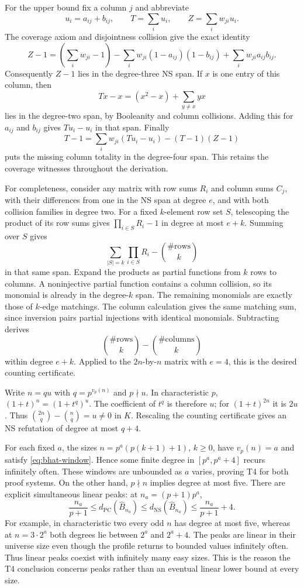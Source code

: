 \documentclass[11pt,a4paper]{article}
\theoremstyle{definition}\newtheorem{definition}[theorem]{Definition}
\theoremstyle{remark}\newtheorem{remark}[theorem]{Remark}
\begin{document}
For the upper bound fix a column $j$ and abbreviate
\[
 u_i=a_{ij}+b_{ij},\qquad T=\sum_i u_i,\qquad
 Z=\sum_i w_{ji}u_i.
\]
The coverage axiom and disjointness collision give the exact identity
\[
 Z-1=(\sum_iw_{ji}-1)
 -\sum_iw_{ji}(1-a_{ij})(1-b_{ij})
 +\sum_iw_{ji}a_{ij}b_{ij}.
\]
Consequently $Z-1$ lies in the degree-three NS span. If $x$ is one entry
of this column, then
\[
 Tx-x=(x^2-x)+\sum_{y\ne x}yx
\]
lies in the degree-two span, by Booleanity and column collisions.
Adding this for $a_{ij}$ and $b_{ij}$ gives $Tu_i-u_i$ in that span.
Finally
\[
 T-1=\sum_iw_{ji}(Tu_i-u_i)-(T-1)(Z-1)
\]
puts the missing column totality in the degree-four span. This retains
the coverage witnesses throughout the derivation.

For completeness, consider any matrix with row sums $R_i$ and column
sums $C_j$, with their differences from one in the NS span at degree
$e$, and with both collision families in degree two. For a fixed
$k$-element row set $S$, telescoping the product of its row sums gives
$\prod_{i\in S}R_i-1$ in degree at most $e+k$. Summing over $S$ gives
\[
 \sum_{|S|=k}\prod_{i\in S}R_i-\binom{\#\mathrm{rows}}k
\]
in that same span. Expand the products as partial functions from $k$
rows to columns. A noninjective partial function contains a column
collision, so its monomial is already in the degree-$k$ span.
The remaining monomials are exactly those of $k$-edge matchings.
The column calculation gives the same matching sum, since inversion
pairs partial injections with identical monomials. Subtracting derives
\[
 \binom{\#\mathrm{rows}}k-\binom{\#\mathrm{columns}}k
\]
within degree $e+k$. Applied to the $2n$-by-$n$ matrix with $e=4$, this
is the desired counting certificate.

Write $n=qu$ with $q=p^{v_p(n)}$ and $p\nmid u$. In characteristic
$p$, $(1+t)^n=(1+t^q)^u$. The coefficient of $t^q$ is therefore $u$;
for $(1+t)^{2n}$ it is $2u$. Thus
$\binom{2n}q-\binom nq=u\ne0$ in $K$. Rescaling the counting
certificate gives an NS refutation of degree at most $q+4$.

For each fixed $a$, the sizes $n=p^a(p(k+1)+1)$, $k\geq0$, have
$v_p(n)=a$ and satisfy \eqref{eq:bhat-window}. Hence some finite degree in
$[p^a,p^a+4]$ recurs infinitely often. These windows are unbounded as $a$
varies, proving T4 for both proof systems. On the other hand, $p\nmid n$
implies degree at most five. There are explicit simultaneous linear peaks:
at $n_a=(p+1)p^a$,
\[
 \frac{n_a}{p+1}\leq d_{\mathrm{PC}}(\widehat B_{n_a})
 \leq d_{\mathrm{NS}}(\widehat B_{n_a})
 \leq\frac{n_a}{p+1}+4.
\]
For example, in characteristic two every odd $n$ has degree at most
five, whereas at $n=3\cdot2^a$ both degrees lie between $2^a$ and
$2^a+4$. The peaks are linear in their universe size even though the
profile returns to bounded values infinitely often.
Thus linear peaks coexist with infinitely many easy sizes. This is the
reason the T4 conclusion concerns peaks rather than an eventual linear
lower bound at every size.
\end{document}
